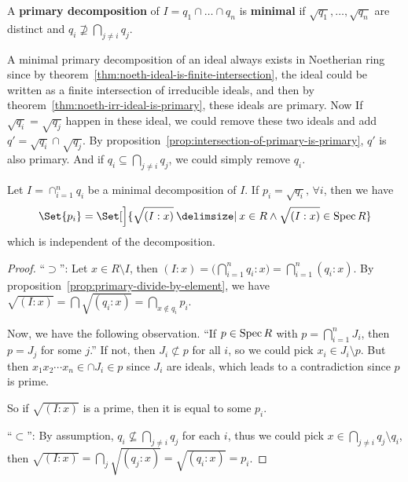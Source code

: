 \begin{definition}
  A {\bf primary decomposition} of $I = q_1 \cap \dots \cap q_n$ is {\bf minimal} if $\sqrt{q_1}, \dots, \sqrt{q_n}$
  are distinct and $q_i \not\supseteq \bigcap_{j \neq i} q_j$.
\end{definition}

A minimal primary decomposition of an ideal always exists in Noetherian ring since by
theorem~\ref{thm:noeth-ideal-is-finite-intersection}, the ideal could be written
as a finite intersection of irreducible ideals, and then by theorem~\ref{thm:noeth-irr-ideal-is-primary},
these ideals are primary. Now If $\sqrt{q_i} = \sqrt{q_j}$ happen in these ideal,
we could remove these two ideals and add $q' = \sqrt{q_i} \cap \sqrt{q_j}$.
By proposition~\ref{prop:intersection-of-primary-is-primary}, $q'$ is also primary.
And if $q_i \subseteq \bigcap_{j \neq i} q_j$, we could simply remove $q_i$.

\medskip

\begin{theorem}
  Let $I = \cap_{i = 1}^n q_i$ be a minimal decomposition of $I$.
  If $p_i = \sqrt{q_i}, \, \forall i$, then we have
  \[ \Set{p_i} = \Set[\Big ]{ \sqrt{(I: x)} \given x \in R \land \sqrt{(I: x)} \in \Spec R } \]
  which is independent of the decomposition.

  \begin{proof}
    ``$\supset$'': Let $x \in R \setminus I$, then $(I: x) = \big( \bigcap_{i=1}^n q_i : x \big)
    = \bigcap_{i = 1}^n (q_i: x)$. By proposition~\ref{prop:primary-divide-by-element},
    we have $\sqrt{(I: x)} = \bigcap \sqrt{(q_i: x)} = \bigcap_{x \notin q_i} p_i$.

    Now, we have the following observation. ``If $p \in \operatorname{Spec} R$ with $p = \bigcap_{i=1}^n J_i$,
    then $p = J_j$ for some $j$.'' If not, then $J_i \not\subset p$ for all $i$,
    so we could pick $x_i \in J_i \setminus p$.
    But then $x_1 x_2 \dotsm x_n \in \cap J_i \in p$ since $J_i$ are ideals,
    which leads to a contradiction since $p$ is prime.

    So if $\sqrt{(I: x)}$ is a prime, then it is equal to some $p_i$.

    ``$\subset$'': By assumption, $q_i \not\subseteq \bigcap_{j \neq i} q_j$ for each $i$,
    thus we could pick $x \in \bigcap_{j \neq i} q_j \setminus q_i$,
    then $\sqrt{(I: x)} = \bigcap_j \sqrt{(q_j: x)} = \sqrt{(q_i: x)} = p_i$.
  \end{proof}
\end{theorem}

